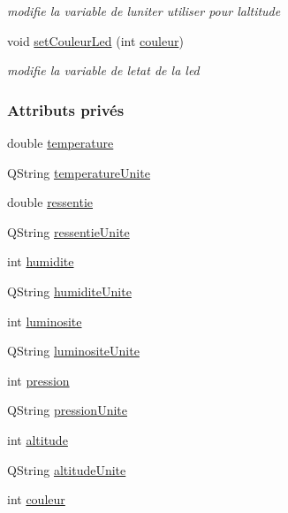 \begin{DoxyCompactItemize}
\begin{DoxyCompactList}\small\item\em modifie la variable de l\textquotesingle{}uniter utiliser pour l\textquotesingle{}altitude \end{DoxyCompactList}\item 
void \hyperlink{class_esp32_a32d0d1abb41a3762a54e9f5a33b3b247}{set\+Couleur\+Led} (int \hyperlink{class_esp32_ae8f6b2080769949ae5bd41c8312a6892}{couleur})
\begin{DoxyCompactList}\small\item\em modifie la variable de l\textquotesingle{}etat de la led \end{DoxyCompactList}\end{DoxyCompactItemize}
\subsubsection*{Attributs privés}
\begin{DoxyCompactItemize}
\item 
double \hyperlink{class_esp32_a8274802633ca34c07fbfe7fa38a171a8}{temperature}
\item 
Q\+String \hyperlink{class_esp32_a825526f0d6b74fda9ddeba7e67ec9dd5}{temperature\+Unite}
\item 
double \hyperlink{class_esp32_a08425470633629dae05f61659ff90375}{ressentie}
\item 
Q\+String \hyperlink{class_esp32_a5333681c08a07f1877c20cfe88b7024f}{ressentie\+Unite}
\item 
int \hyperlink{class_esp32_a7ad1a81c0a3cb29035aaef89d153f662}{humidite}
\item 
Q\+String \hyperlink{class_esp32_a90c1ea9a5598c16a7918205185aa9fd6}{humidite\+Unite}
\item 
int \hyperlink{class_esp32_aa6ce86f87c88d7fd29880e9865fefefc}{luminosite}
\item 
Q\+String \hyperlink{class_esp32_a67087c5b6b76b64f929dbc255a7d5441}{luminosite\+Unite}
\item 
int \hyperlink{class_esp32_a7ddfb5679b439b204a93f775cfa9d2fa}{pression}
\item 
Q\+String \hyperlink{class_esp32_aad1ead1e2c830025af0eebcdb30bcafe}{pression\+Unite}
\item 
int \hyperlink{class_esp32_ab257f7aff043b4d60d963e1bfd1fe35f}{altitude}
\item 
Q\+String \hyperlink{class_esp32_ad407a4a4139183be7c4293fb254c96d7}{altitude\+Unite}
\item 
int \hyperlink{class_esp32_ae8f6b2080769949ae5bd41c8312a6892}{couleur}
\end{DoxyCompactItemize}


